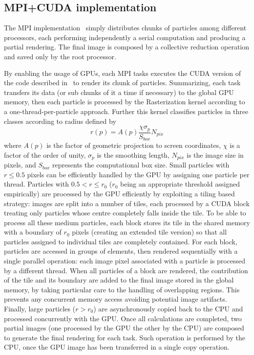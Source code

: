 \documentclass{egpubl}
\begin{document}
\subsection{MPI+CUDA implementation}
The MPI implementation~\cite{JKR*10} simply distributes chunks of particles among different processors, each performing independently a serial computation and producing a partial rendering. The final image is composed by a collective reduction operation and saved only by the root processor.

By enabling the usage of GPUs, each MPI tasks executes the CUDA version of the code described in~\cite{RGD*14} to render its chunk of particles. 
Summarizing, each task transfers its data (or sub chunks of it a time if necessary) to the global GPU memory, then each particle is processed by the Rasterization kernel according to a one-thread-per-particle approach. Further this kernel classifies particles in three classes according to radius defined by
\begin{equation}
r(p) = A(p)\frac{\chi \sigma_p}{S_{box}}N_{pix} 
\end{equation}
where $A(p)$ is the factor of geometric projection to screen coordinates, $\chi$ is a factor of the order of unity, $\sigma_p$ is the smoothing length, $N_{pix}$ is the image size in pixels, and $S_{box}$ represents the computational box size. Small particles with $r \le 0.5$ pixels can be efficiently handled by the GPU by assigning one particle per thread. Particles with $0.5 < r \le r_0$ ($r_0$ being an appropriate threshold assigned empirically) are processed by the GPU efficiently by exploiting a tiling based strategy: images are split into a number of tiles, each processed by a CUDA block treating only particles whose centre completely falls inside the tile. To be able to process all these medium particles, each block stores its tile in the shared memory with a boundary of $r_0$ pixels (creating an extended tile version) so that all particles assigned to individual tiles are completely contained. For each block, particles are accessed in groups of elements, then rendered sequentially with a single parallel operation: each image pixel associated with a particle is processed by a different thread. When all particles of a block are rendered, the contribution of the tile and its boundary are added to the final image stored in the global memory, by taking particular care to the handling of overlapping regions. This prevents any concurrent memory access avoiding potential image artifacts. Finally, large particles ($r>r_0$) are asynchronously copied back to the CPU and processed concurrently with the GPU.
Once all calculations are completed, two partial images (one processed by the GPU the other by the CPU) are composed to generate the final rendering for each task. Such operation is performed by the CPU, once the GPU image has been transferred in a single copy operation.
\end{document}
